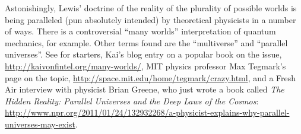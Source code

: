 {%
% 

Astonishingly, Lewis' doctrine of the reality of the plurality of
possible worlds is being paralleled (pun absolutely intended) by
theoretical physicists in a number of ways. There is a controversial
``many worlds'' interpretation of quantum mechanics, for example.
Other terms found are the ``multiverse'' and ``parallel universes''.
See for starters, Kai's blog entry on a popular book on the issue,
\url{http://kaivonfintel.org/many-worlds/}, MIT physics
professor Max Tegmark's page on the topic,
\url{http://space.mit.edu/home/tegmark/crazy.html}, and a Fresh Air
interview with physicist Brian Greene, who just wrote a book called
\emph{The Hidden Reality: Parallel Universes and the Deep Laws of the
  Cosmos}:
\url{http://www.npr.org/2011/01/24/132932268/a-physicist-explains-why-parallel-universes-may-exist}.
}




